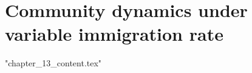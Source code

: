 %

\let\textcircled=\pgftextcircled
\chapter{Community dynamics under variable immigration rate} %
\label{chap:stress_testing}

{"chapter_13_content.tex"}
